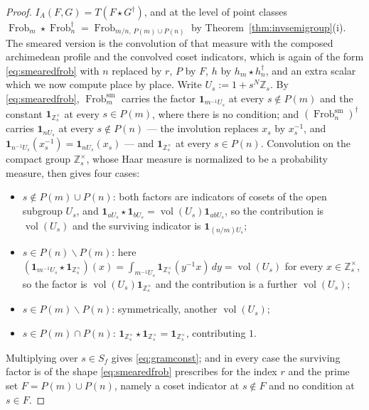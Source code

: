 \documentclass[11pt]{amsart}
\theoremstyle{definition}
\theoremstyle{remark}
\newcommand{\Z}{\mathbb Z}
\newcommand{\Frob}{\operatorname{Frob}}
\newcommand{\vol}{\operatorname{vol}}
\begin{document}
\begin{proof}
$I_A(F,G)=T(F\star G^\dagger)$, and at the level of point classes
$\Frob_m\star\Frob_n^\dagger=\Frob_{m/n,\,P(m)\cup P(n)}$ by
Theorem~\ref{thm:invsemigroup}(i). The smeared version is the convolution of
that measure with the composed archimedean profile and the convolved coset
indicators, which is again of the form \eqref{eq:smearedfrob} with $n$ replaced
by $r$, $P$ by $F$, $h$ by $h_m\star h_n^\dagger$, and an extra scalar which
we now compute place by place. Write $U_s:=1+s^N\Z_s$. By
\eqref{eq:smearedfrob}, $\Frob_m^{\mathrm{sm}}$ carries the factor
$\mathbf 1_{m^{-1}U_s}$ at every $s\notin P(m)$ and the constant
$\mathbf 1_{\Z_s^\times}$ at every $s\in P(m)$, where there is no condition;
and $(\Frob_n^{\mathrm{sm}})^\dagger$ carries $\mathbf 1_{nU_s}$ at every
$s\notin P(n)$ --- the involution replaces $x_s$ by $x_s^{-1}$, and
$\mathbf 1_{n^{-1}U_s}(x_s^{-1})=\mathbf 1_{nU_s}(x_s)$ --- and
$\mathbf 1_{\Z_s^\times}$ at every $s\in P(n)$. Convolution on the compact
group $\Z_s^\times$, whose Haar measure is normalized to be a probability
measure, then gives four cases:
\begin{itemize}
\item $s\notin P(m)\cup P(n)$: both factors are indicators of cosets of the
 open subgroup $U_s$, and
 $\mathbf 1_{aU_s}\star\mathbf 1_{bU_s}=\vol(U_s)\mathbf 1_{abU_s}$, so the
 contribution is $\vol(U_s)$ and the surviving indicator is
 $\mathbf 1_{(n/m)U_s}$;
\item $s\in P(n)\smallsetminus P(m)$: here
 $(\mathbf 1_{m^{-1}U_s}\star\mathbf 1_{\Z_s^\times})(x)
  =\int_{m^{-1}U_s}\mathbf 1_{\Z_s^\times}(y^{-1}x)\,dy=\vol(U_s)$ for every
 $x\in\Z_s^\times$, so the factor is $\vol(U_s)\mathbf 1_{\Z_s^\times}$ and
 the contribution is a further $\vol(U_s)$;
\item $s\in P(m)\smallsetminus P(n)$: symmetrically, another $\vol(U_s)$;
\item $s\in P(m)\cap P(n)$:
 $\mathbf 1_{\Z_s^\times}\star\mathbf 1_{\Z_s^\times}
  =\mathbf 1_{\Z_s^\times}$, contributing $1$.
\end{itemize}
Multiplying over $s\in S_f$ gives \eqref{eq:gramconst}; and in every case the
surviving factor is of the shape \eqref{eq:smearedfrob} prescribes for the
index $r$ and the prime set $F=P(m)\cup P(n)$, namely a coset indicator at
$s\notin F$ and no condition at $s\in F$.


\end{proof}
\end{document}
